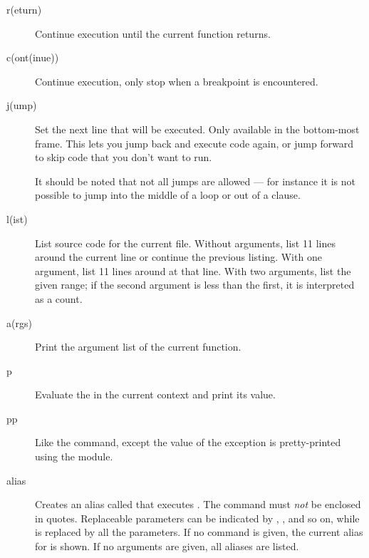 \begin{description}
\item[r(eturn)]

Continue execution until the current function returns.

\item[c(ont(inue))]

Continue execution, only stop when a breakpoint is encountered.

\item[j(ump) ]

Set the next line that will be executed.  Only available in the
bottom-most frame.  This lets you jump back and execute code
again, or jump forward to skip code that you don't want to run.

It should be noted that not all jumps are allowed --- for instance it
is not possible to jump into the middle of a  loop or out
of a  clause.

\item[l(ist) ]

List source code for the current file.  Without arguments, list 11
lines around the current line or continue the previous listing.  With
one argument, list 11 lines around at that line.  With two arguments,
list the given range; if the second argument is less than the first,
it is interpreted as a count.

\item[a(rgs)]

Print the argument list of the current function.

\item[p ]

Evaluate the  in the current context and print its
value.  

\item[pp ]

Like the  command, except the value of the exception is
pretty-printed using the  module.

\item[alias ]

Creates an alias called  that executes .  The
command must \emph{not} be enclosed in quotes.  Replaceable parameters
can be indicated by , , and so on, while \samp{\%*} is
replaced by all the parameters.  If no command is given, the current
alias for  is shown. If no arguments are given, all
aliases are listed.


\end{description}
